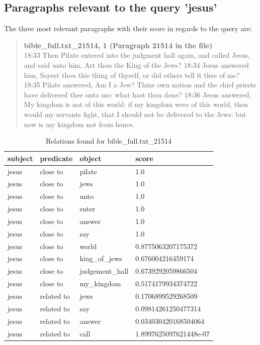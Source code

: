 \clearpage
\subsection{Paragraphs relevant to the query 'jesus'}
The three most relevant paragraphs with their score in regards to the query are:
\blockquote{
\textbf{bible\_full.txt\_21514, 1 (Paragraph 21514 in the file)}\\
18:33 Then Pilate entered into the judgment hall again, and called Jesus, and said unto him, Art thou the King of the Jews? 18:34 Jesus answered him, Sayest thou this thing of thyself, or did others tell it thee of me? 18:35 Pilate answered, Am I a Jew? Thine own nation and the chief priests have delivered thee unto me: what hast thou done? 18:36 Jesus answered, My kingdom is not of this world: if my kingdom were of this world, then would my servants fight, that I should not be delivered to the Jews: but now is my kingdom not from hence.}
\begin{table}[H]
\centering
    \begin{tabular}{|l|l|l|l|}
    \hline
    subject & predicate & object & score \\
    \hline
    jesus & close to & pilate & 1.0\\
    jesus &close to& jews & 1.0\\
    jesus &close to& unto & 1.0\\
    jesus &close to& enter & 1.0\\
    jesus &close to& answer & 1.0\\
    jesus &close to& say & 1.0\\
    jesus &close to& world & 0.8775063207175372\\
    jesus &close to& king\_of\_jews & 0.676004216459174\\
    jesus &close to& judgement\_hall & 0.6739292059866504\\
    jesus &close to& my\_kingdom & 0.5174179934374722\\
    \hline
    jesus & related to & jews & 0.1706899529268509 \\
    jesus &related to & say & 0.09814261250477314 \\
    jesus &related to & answer & 0.034030420168504064 \\
    jesus &related to & call & 1.8997625097621448e-07 \\
    \hline
\end{tabular}
\caption{Relations found for bible\_full.txt\_21514}
\label{tab:relations_jesus_21514}
\end{table}

